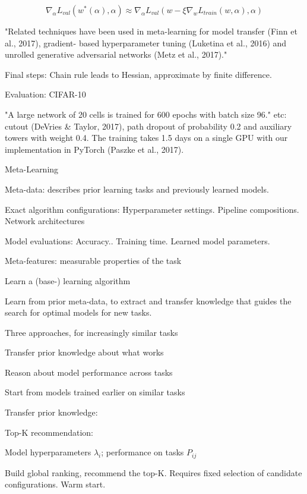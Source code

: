 \documentclass[english]{article}
\begin{document}
$$\nabla_\alpha L_{val}(w^*(\alpha),\alpha)
\approx
\nabla_\alpha L_{val}(w-\xi \nabla_w L_{train}(w,\alpha),\alpha)
$$

"Related techniques have been used in meta-learning for model transfer (Finn et al., 2017), gradient-
based hyperparameter tuning (Luketina et al., 2016) and unrolled generative adversarial networks
(Metz et al., 2017)."

Final steps: Chain rule leads to Hessian, approximate by finite difference. 

\item Evaluation: CIFAR-10 

"A large network of 20 cells is trained for 600 epochs with batch size 96." etc: cutout (DeVries \& Taylor, 2017), path dropout of
probability 0.2 and auxiliary towers with weight 0.4. The training takes 1.5 days on a single GPU
with our implementation in PyTorch (Paszke et al., 2017).

\eenum

\item Meta-Learning

\benum 
\item Meta-data: describes prior learning tasks and previously learned models.

Exact algorithm configurations: Hyperparameter settings. Pipeline compositions. Network architectures


Model evaluations: Accuracy.. Training time.  Learned model parameters.

Meta-features: measurable properties of the task 

\item Learn a (base-) learning algorithm

Learn from prior meta-data, to extract and transfer knowledge that guides the search for optimal models for new tasks.

\item Three approaches, for increasingly similar tasks


\benum 
\item Transfer prior knowledge about what works
\item Reason about model performance across tasks
\item Start from models trained earlier on similar tasks
\eenum

\item Transfer prior knowledge: 

\benum 
\item Top-K recommendation:
\item Model hyperparameters $\lambda_i$; performance on tasks $P_{ij}$
\item Build global ranking, recommend the top-K. Requires fixed selection of candidate configurations. Warm start.
\end{document}
